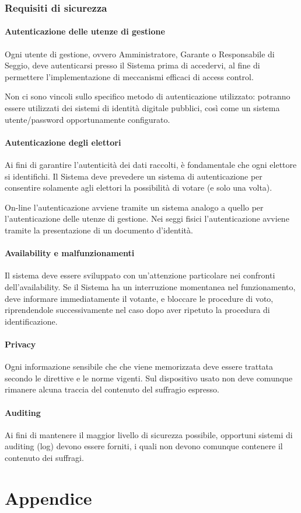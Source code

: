 \documentclass{report}
\begin{document}
\subsection{Requisiti di sicurezza}

\subsubsection{Autenticazione delle utenze di gestione}
Ogni utente di gestione, ovvero Amministratore, Garante o Responsabile di Seggio, deve autenticarsi presso il Sistema prima di accedervi, al fine di permettere l'implementazione di meccanismi efficaci di access control. 

Non ci sono vincoli sullo specifico metodo di autenticazione utilizzato: potranno essere utilizzati dei sistemi di identità digitale pubblici, così come un sistema utente/password opportunamente configurato.

\subsubsection{Autenticazione degli elettori}
Ai fini di garantire l'autenticità dei dati raccolti, è fondamentale che ogni elettore si identifichi. Il Sistema deve prevedere un sistema di autenticazione per consentire solamente agli elettori la possibilità di votare (e solo una volta).

On-line l'autenticazione avviene tramite un sistema analogo a quello per l'autenticazione delle utenze di gestione. Nei seggi fisici l'autenticazione avviene tramite la presentazione di un documento d'identità.

\subsubsection{Availability e malfunzionamenti}
Il sistema deve essere sviluppato con un'attenzione particolare nei confronti dell'availability. Se il Sistema ha un interruzione momentanea nel funzionamento, deve informare immediatamente il votante, e bloccare le procedure di voto, riprendendole successivamente nel caso dopo aver ripetuto la procedura di identificazione.

\subsubsection{Privacy}
Ogni informazione sensibile che che viene memorizzata deve essere trattata secondo le direttive e le norme vigenti. Sul dispositivo usato non deve comunque rimanere alcuna traccia del contenuto del suffragio espresso.

\subsubsection{Auditing}
Ai fini di mantenere il maggior livello di sicurezza possibile, opportuni sistemi di auditing (log) devono essere forniti, i quali non devono comunque contenere il contenuto dei suffragi.






\chapter{Appendice}
\end{document}

